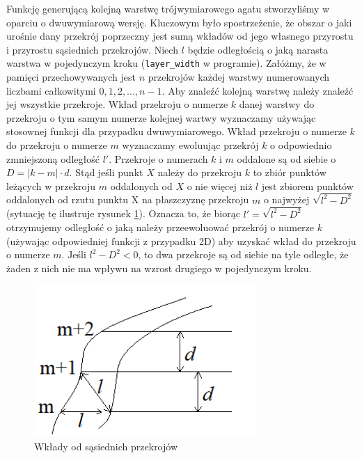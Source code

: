 \documentclass{article}
\begin{document}
Funkcję generującą kolejną warstwę trójwymiarowego agatu stworzyliśmy w oparciu o dwuwymiarową wersję. Kluczowym było spostrzeżenie, że obszar o jaki urośnie dany przekrój poprzeczny jest sumą wkładów od jego własnego przyrostu i przyrostu sąsiednich przekrojów. Niech $l$ będzie odległością o jaką narasta warstwa w pojedynczym kroku (\texttt{layer\_width} w programie). Załóżmy, że w pamięci przechowywanych jest $n$ przekrojów każdej warstwy numerowanych liczbami całkowitymi $0,1,2,...,n-1$. Aby znaleźć kolejną warstwę należy znaleźć jej wszystkie przekroje. Wkład przekroju o numerze $k$ danej warstwy do przekroju o tym samym numerze kolejnej wartwy wyznaczamy używając stosownej funkcji dla przypadku dwuwymiarowego. Wkład przekroju o numerze $k$ do przekroju o numerze $m$ wyznaczamy ewoluując przekrój $k$ o odpowiednio zmniejszoną odległość $l'$. Przekroje o numerach $k$ i $m$ oddalone są od siebie o $D=|k-m| \cdot d$. Stąd jeśli punkt $X$ należy do przekroju $k$ to zbiór punktów leżących w przekroju $m$ oddalonych od $X$ o nie więcej niż $l$ jest zbiorem punktów oddalonych od rzutu punktu X na płaszczyznę przekroju $m$ o najwyżej $\sqrt{l^2-D^2}$ (sytuację tę ilustruje rysunek \ref{wklady_od_przekrojow}). Oznacza to, że biorąc $l'=\sqrt{l^2-D^2}$ otrzymujemy odległość o jaką należy przeewoluować przekrój o numerze $k$ (używając odpowiedniej funkcji z przypadku 2D) aby uzyskać wkład do przekroju o numerze $m$. Jeśli $l^2-D^2<0$, to dwa przekroje są od siebie na tyle odległe, że żaden z nich nie ma wpływu na wzrost drugiego w pojedynczym kroku.
\begin{figure}[H]
\caption{Wkłady od sąsiednich przekrojów}
\label{wklady_od_przekrojow}
\centering
\includegraphics[width=0.75\textwidth]{obrazy/wklady_od_przekrojow.png}
\end{figure}
\end{document}
